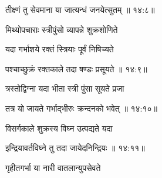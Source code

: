 
{\devanagarifont तीक्ष्णं तु सेवमाना या जात्यन्धं जनयेत्सुतम् {॥ १४:८॥} \veg\dontdisplaylinenum }%

{\devanagarifont मिथ्योपचाराः स्त्रीपुंसो व्यापन्ने शुक्रशोणिते \thinspace{\dandab} \dontdisplaylinenum }%

{\devanagarifont यदा गर्भाशये रक्तं स्त्रियाः पूर्वं निषिच्यते  \danda\dontdisplaylinenum }%


{\devanagarifont पश्चाच्छुक्रं रक्तकाले तदा षण्डः प्रसूयते {॥ १४:९॥} \veg\dontdisplaylinenum }%

{\devanagarifont त्रस्तोद्विग्ना यदा भीता स्त्री पुंसा सूयते प्रजा \thinspace{\dandab} \dontdisplaylinenum }%


{\devanagarifont तत्र यो जायते गर्भाद्भीरुः क्रन्दनको भवेत् {॥ १४:१०॥} \veg\dontdisplaylinenum }%

{\devanagarifont विसर्गकाले शुक्रस्य विघ्न उत्पद्यते यदा \thinspace{\dandab} \dontdisplaylinenum }%


{\devanagarifont इन्द्रियावर्तविघ्ने तु तदा जायेदनिन्द्रियः {॥ १४:११॥} \veg\dontdisplaylinenum }%

{\devanagarifont गृहीतगर्भा या नारी वातलान्युपसेवते \thinspace{\dandab} \dontdisplaylinenum }%
 

